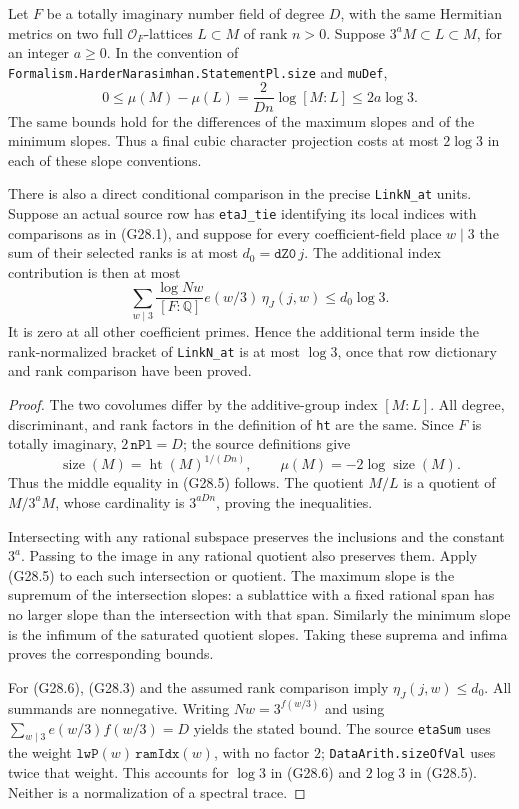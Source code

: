 \begin{corollary}
\label{AC-G28-normalization}
Let $F$ be a totally imaginary number field of degree $D$,
with the same Hermitian metrics on two full $\mathcal O_F$-lattices
$L\subset M$ of rank $n>0$.  Suppose
$3^aM\subset L\subset M$, for an integer $a\ge0$.
In the convention of
\texttt{Formalism.HarderNarasimhan.StatementPl.size} and
\texttt{muDef},
\[
 0\le\mu(M)-\mu(L)
   =\frac{2}{Dn}\log[M:L]\le2a\log3.                  \tag{G28.5}
\]
The same bounds hold for the differences of the maximum
slopes and of the minimum slopes.  Thus a final cubic
character projection costs at most $2\log3$ in each of
these slope conventions.

There is also a direct conditional comparison in the precise
\texttt{LinkN\_at} units.  Suppose an actual source row has
\texttt{etaJ\_tie} identifying its local indices with comparisons
as in (G28.1), and suppose for every coefficient-field place
$w\mid3$ the sum of their selected ranks is at most
$d_0=\texttt{dZ0}\,j$.  The additional index contribution is
then at most
\[
 \sum_{w\mid3}\frac{\log Nw}{[F:\mathbb Q]}
                 e(w/3)\,\eta_J(j,w)
              \le d_0\log3.                            \tag{G28.6}
\]
It is zero at all other coefficient primes.  Hence the
additional term inside the rank-normalized bracket of
\texttt{LinkN\_at} is at most $\log3$, once that row dictionary
and rank comparison have been proved.
\end{corollary}
\begin{proof}
The two covolumes differ by the additive-group index
$[M:L]$.  All degree, discriminant, and rank factors in the
definition of \texttt{ht} are the same.  Since $F$ is totally
imaginary, $2\,\texttt{nPl}=D$; the source definitions give
\[
 \operatorname{size}(M)=\operatorname{ht}(M)^{1/(Dn)},
 \qquad \mu(M)=-2\log\operatorname{size}(M).
\]
Thus the middle equality in (G28.5) follows.  The quotient
$M/L$ is a quotient of $M/3^aM$, whose cardinality is
$3^{aDn}$, proving the inequalities.

Intersecting with any rational subspace preserves the
inclusions and the constant $3^a$.  Passing to the image in
any rational quotient also preserves them.  Apply (G28.5)
to each such intersection or quotient.  The maximum slope
is the supremum of the intersection slopes: a sublattice
with a fixed rational span has no larger slope than the
intersection with that span.  Similarly the minimum slope
is the infimum of the saturated quotient slopes.  Taking
these suprema and infima proves the corresponding bounds.

For (G28.6), (G28.3) and the assumed rank comparison imply
$\eta_J(j,w)\le d_0$.  All summands are nonnegative.
Writing $Nw=3^{f(w/3)}$ and using
$\sum_{w\mid3}e(w/3)f(w/3)=D$ yields the stated bound.
The source \texttt{etaSum} uses the weight
$\texttt{lwP}(w)\,\texttt{ramIdx}(w)$, with no factor $2$;
\texttt{DataArith.sizeOfVal} uses twice that weight.
This accounts for $\log3$ in (G28.6) and $2\log3$ in
(G28.5).  Neither is a normalization of a spectral trace.
\end{proof}

